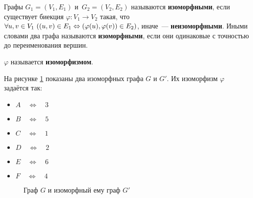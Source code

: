 Графы $G_1 = (V_1, E_1)$ и~$G_2 = (V_2, E_2)$ называются \textbf{изоморфными}, если существует биекция $\varphi \colon V_1 \to V_2$ такая, что
$\forall u, v \in V_1 \ \allowbreak ((u, v) \in E_1 \opbr\Leftrightarrow (\varphi(u), \varphi(v)) \in E_2)$, иначе~--- \textbf{неизоморфными}. Иными словами два графа называются \textbf{изоморфными}, если они одинаковые с точностью до переименования вершин.

$\varphi$ называется \textbf{изоморфизмом}.

На рисунке \ref{isograph} показаны два изоморфных графа $G$ и $G'$. Их изоморфизм $\varphi$ задаётся так:

\begin{itemize}
	\item $A \quad \Leftrightarrow \quad 3$
	\item $B \quad \Leftrightarrow \quad 5$
	\item $C \quad \Leftrightarrow \quad 1$
	\item $D \quad \Leftrightarrow \quad 2$
	\item $E \quad \Leftrightarrow \quad 6$
	\item $F \quad \Leftrightarrow \quad 4$
\end{itemize}

\begin{figure}[h!]
\begin{center}
\end{center}
\caption{Граф $G$ и изоморфный ему граф $G'$}
\label{isograph}
\end{figure}



